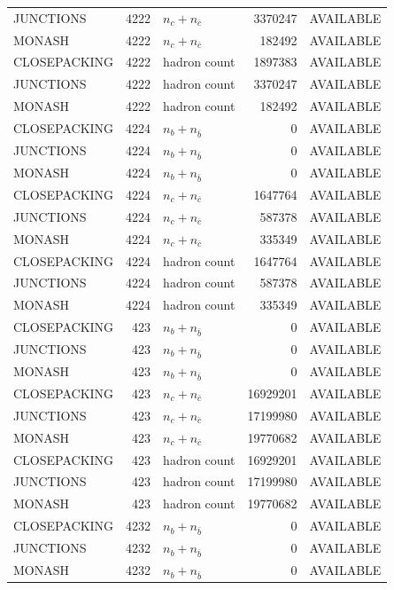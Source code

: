 \begin{landscape}
\begin{longtable}{@{}lrlrl@{}}
JUNCTIONS & 4222 & $n_c+n_{\bar c}$ & \num{3370247} & AVAILABLE \\
MONASH & 4222 & $n_c+n_{\bar c}$ & \num{182492} & AVAILABLE \\
CLOSEPACKING & 4222 & hadron count & \num{1897383} & AVAILABLE \\
JUNCTIONS & 4222 & hadron count & \num{3370247} & AVAILABLE \\
MONASH & 4222 & hadron count & \num{182492} & AVAILABLE \\
CLOSEPACKING & 4224 & $n_b+n_{\bar b}$ & \num{0} & AVAILABLE \\
JUNCTIONS & 4224 & $n_b+n_{\bar b}$ & \num{0} & AVAILABLE \\
MONASH & 4224 & $n_b+n_{\bar b}$ & \num{0} & AVAILABLE \\
CLOSEPACKING & 4224 & $n_c+n_{\bar c}$ & \num{1647764} & AVAILABLE \\
JUNCTIONS & 4224 & $n_c+n_{\bar c}$ & \num{587378} & AVAILABLE \\
MONASH & 4224 & $n_c+n_{\bar c}$ & \num{335349} & AVAILABLE \\
CLOSEPACKING & 4224 & hadron count & \num{1647764} & AVAILABLE \\
JUNCTIONS & 4224 & hadron count & \num{587378} & AVAILABLE \\
MONASH & 4224 & hadron count & \num{335349} & AVAILABLE \\
CLOSEPACKING & 423 & $n_b+n_{\bar b}$ & \num{0} & AVAILABLE \\
JUNCTIONS & 423 & $n_b+n_{\bar b}$ & \num{0} & AVAILABLE \\
MONASH & 423 & $n_b+n_{\bar b}$ & \num{0} & AVAILABLE \\
CLOSEPACKING & 423 & $n_c+n_{\bar c}$ & \num{16929201} & AVAILABLE \\
JUNCTIONS & 423 & $n_c+n_{\bar c}$ & \num{17199980} & AVAILABLE \\
MONASH & 423 & $n_c+n_{\bar c}$ & \num{19770682} & AVAILABLE \\
CLOSEPACKING & 423 & hadron count & \num{16929201} & AVAILABLE \\
JUNCTIONS & 423 & hadron count & \num{17199980} & AVAILABLE \\
MONASH & 423 & hadron count & \num{19770682} & AVAILABLE \\
CLOSEPACKING & 4232 & $n_b+n_{\bar b}$ & \num{0} & AVAILABLE \\
JUNCTIONS & 4232 & $n_b+n_{\bar b}$ & \num{0} & AVAILABLE \\
MONASH & 4232 & $n_b+n_{\bar b}$ & \num{0} & AVAILABLE \\

\end{longtable}
\end{landscape}
